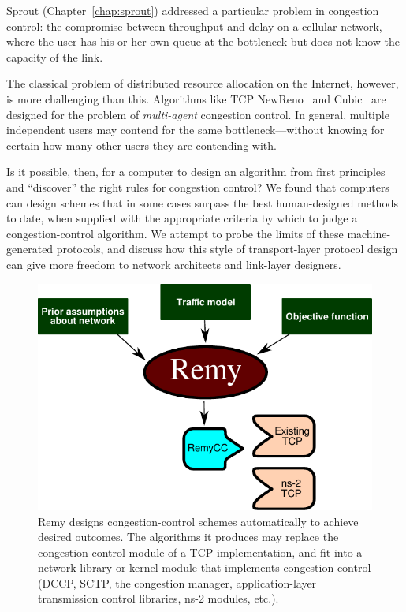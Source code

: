 \label{remy:intro}

Sprout (Chapter~\ref{chap:sprout}) addressed a particular problem in
congestion control: the compromise between throughput and delay on a
cellular network, where the user has his or her own queue at the
bottleneck but does not know the capacity of the link.

The classical problem of distributed resource allocation on the
Internet, however, is more challenging than this. Algorithms like TCP
NewReno~\cite{newreno} and Cubic~\cite{cubic} are designed for the
problem of \emph{multi-agent} congestion control. In general, multiple
independent users may contend for the same bottleneck---without
knowing for certain how many other users they are contending with.

Is it possible, then, for a computer to design an algorithm from first
principles and ``discover'' the right rules for congestion control? We
found that computers can design schemes that in some cases surpass the
best human-designed methods to date, when supplied with the
appropriate criteria by which to judge a congestion-control
algorithm. We attempt to probe the limits of these machine-generated
protocols, and discuss how this style of transport-layer protocol
design can give more freedom to network architects and link-layer
designers.

\begin{figure}
\vspace{\baselineskip}
\begin{centering}
\includegraphics[width=0.75 \columnwidth]{remy.pdf}
\caption{Remy designs congestion-control schemes automatically to
  achieve desired outcomes. The algorithms it produces may replace
the congestion-control module of a TCP implementation, and fit into
a network library or kernel module that implements congestion
control (DCCP, SCTP, the congestion manager, application-layer
transmission control libraries, ns-2 modules, etc.).}

\end{centering}

\end{figure}

